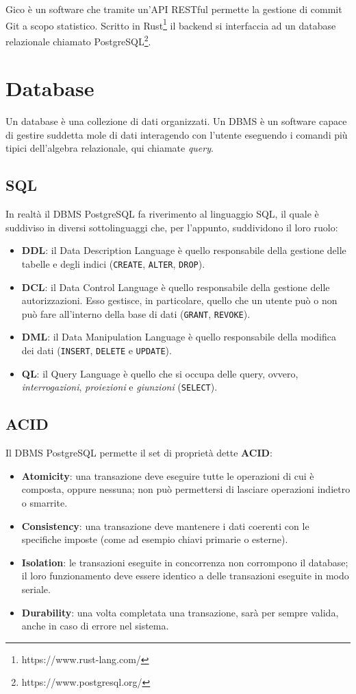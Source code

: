 Gico è un software che tramite un'API RESTful permette la gestione di commit Git a scopo statistico.
Scritto in Rust\footnote{https://www.rust-lang.com/} il backend si interfaccia ad un database relazionale chiamato PostgreSQL\footnote{https://www.postgresql.org/}.
\section{Database}
Un database è una collezione di dati organizzati. Un DBMS è un software capace di gestire suddetta mole di dati interagendo con l'utente eseguendo i comandi più tipici dell'algebra relazionale, qui chiamate \textit{query}.\\
\subsection{SQL}
In realtà il DBMS PostgreSQL fa riverimento al linguaggio SQL, il quale è suddiviso in diversi sottolinguaggi che, per l'appunto, suddividono il loro ruolo:
\begin{itemize}
	\item \textbf{DDL}: il Data Description Language è quello responsabile della gestione delle tabelle e degli indici (\verb|CREATE|, \verb|ALTER|, \verb|DROP|).
	\item \textbf{DCL}: il Data Control Language è quello responsabile della gestione delle autorizzazioni. Esso gestisce, in particolare, quello che un utente può o non può fare all'interno della base di dati (\verb|GRANT|, \verb|REVOKE|).
	\item \textbf{DML}: il Data Manipulation Language è quello responsabile della modifica dei dati (\verb|INSERT|, \verb|DELETE| e \verb|UPDATE|).
	\item \textbf{QL}: il Query Language è quello che si occupa delle query, ovvero, \textit{interrogazioni}, \textit{proiezioni} e \textit{giunzioni} (\verb|SELECT|).
\end{itemize}

\subsection{ACID}
Il DBMS PostgreSQL permette il set di proprietà dette \textbf{ACID}:
\begin{itemize}
	\item \textbf{Atomicity}: una transazione deve eseguire tutte le operazioni di cui è composta, oppure nessuna; non può permettersi di lasciare operazioni indietro o smarrite.
	\item \textbf{Consistency}: una transazione deve mantenere i dati coerenti con le specifiche imposte (come ad esempio chiavi primarie o esterne).
	\item \textbf{Isolation}: le transazioni eseguite in concorrenza non corrompono il database; il loro funzionamento deve essere identico a delle transazioni eseguite in modo seriale.
	\item \textbf{Durability}: una volta completata una transazione, sarà per sempre valida, anche in caso di errore nel sistema.
\end{itemize}

